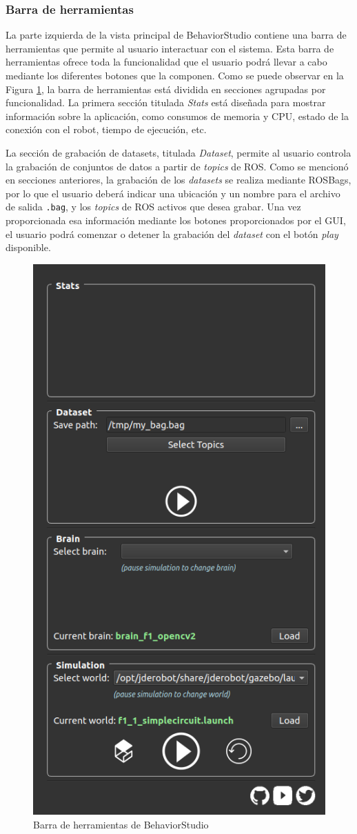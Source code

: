 \subsubsection{Barra de herramientas}

La parte izquierda de la vista principal de BehaviorStudio contiene una barra de herramientas que permite al usuario interactuar con el sistema. Esta barra de herramientas ofrece toda la funcionalidad que el usuario podrá llevar a cabo mediante los diferentes botones que la componen. Como se puede observar en la Figura \ref{fig:toolbar}, la barra de herramientas está dividida en secciones agrupadas por funcionalidad. La primera sección titulada \textit{Stats} está diseñada para mostrar información sobre la aplicación, como consumos de memoria y CPU, estado de la conexión con el robot, tiempo de ejecución, etc.

La sección de grabación de datasets, titulada \textit{Dataset}, permite al usuario controla la grabación de conjuntos de datos a partir de \textit{topics} de ROS. Como se mencionó en secciones anteriores, la grabación de los \textit{datasets} se realiza mediante ROSBags, por lo que el usuario deberá indicar una ubicación y un nombre para el archivo de salida \texttt{.bag}, y los \textit{topics} de ROS activos que desea grabar. Una vez proporcionada esa información mediante los botones proporcionados por el GUI, el usuario podrá comenzar o detener la grabación del \textit{dataset} con el botón \textit{play} disponible.

\begin{figure}
  \centering
  \includegraphics[width=.4\linewidth]{img/toolbar}
  \caption{Barra de herramientas de BehaviorStudio}
  \label{fig:toolbar}
\end{figure}


